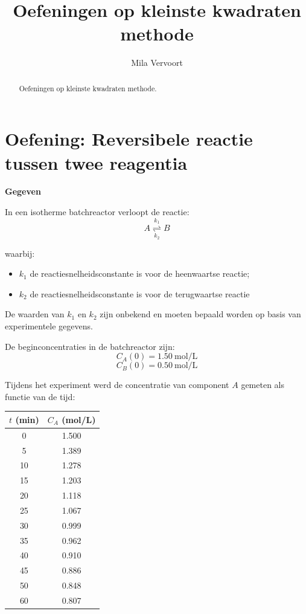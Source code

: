 \documentclass{ximera}
\title{Oefeningen op kleinste kwadraten methode}
\author{Mila Vervoort}
\begin{document}
\begin{abstract}
    Oefeningen op kleinste kwadraten methode.
\end{abstract}
\maketitle
\label{xim:oefeningen kleinste kwadraten methode}

\section*{Oefening: Reversibele reactie tussen twee reagentia}

\textbf{Gegeven}

In een isotherme batchreactor verloopt de reactie:
\[
A \underset{k_2}{\overset{k_1}{\rightleftharpoons}} B
\]

waarbij:
\begin{itemize}
    \item $k_1$ de reactiesnelheidsconstante is voor de heenwaartse reactie;
    \item $k_2$ de reactiesnelheidsconstante is voor de terugwaartse reactie 
\end{itemize}

De waarden van $k_1$ en $k_2$ zijn onbekend en moeten bepaald worden op basis van experimentele gegevens.

De beginconcentraties in de batchreactor zijn:
\[C_A(0)=1.50 \ \mathrm{mol/L}\]
\[C_B(0)=0.50 \ \mathrm{mol/L}\]

Tijdens het experiment werd de concentratie van component $A$ gemeten als functie van de tijd:

\begin{center}
\begin{tabular}{c|c}
$t$ (min) & $C_A$ (mol/L)\\
\hline
0  & 1.500\\
5  & 1.389\\
10 & 1.278\\
15 & 1.203\\
20 & 1.118\\
25 & 1.067\\
30 & 0.999\\
35 & 0.962\\
40 & 0.910\\
45 & 0.886\\
50 & 0.848\\
60 & 0.807
\end{tabular}
\end{center}
\end{document}
